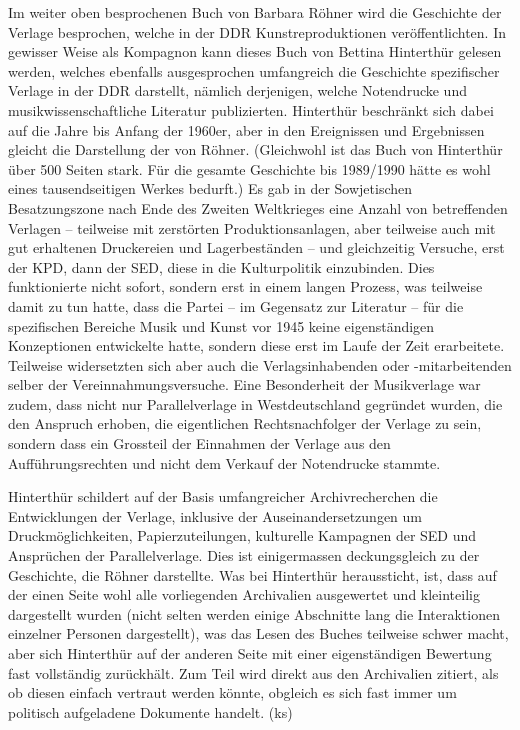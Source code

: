 \documentclass[a4paper,
fontsize=11pt,
oneside,
numbers=noperiodatend,
parskip=half-,
bibliography=totoc,
final
]{scrartcl}
\begin{document}
Im weiter oben besprochenen Buch von Barbara Röhner wird die Geschichte
der Verlage besprochen, welche in der DDR Kunstreproduktionen
veröffentlichten. In gewisser Weise als Kompagnon kann dieses Buch von
Bettina Hinterthür gelesen werden, welches ebenfalls ausgesprochen
umfangreich die Geschichte spezifischer Verlage in der DDR darstellt,
nämlich derjenigen, welche Notendrucke und musikwissenschaftliche
Literatur publizierten. Hinterthür beschränkt sich dabei auf die Jahre
bis Anfang der 1960er, aber in den Ereignissen und Ergebnissen gleicht
die Darstellung der von Röhner. (Gleichwohl ist das Buch von Hinterthür
über 500 Seiten stark. Für die gesamte Geschichte bis 1989/1990 hätte es
wohl eines tausendseitigen Werkes bedurft.) Es gab in der Sowjetischen
Besatzungszone nach Ende des Zweiten Weltkrieges eine Anzahl von
betreffenden Verlagen -- teilweise mit zerstörten Produktionsanlagen,
aber teilweise auch mit gut erhaltenen Druckereien und Lagerbeständen --
und gleichzeitig Versuche, erst der KPD, dann der SED, diese in die
Kulturpolitik einzubinden. Dies funktionierte nicht sofort, sondern erst
in einem langen Prozess, was teilweise damit zu tun hatte, dass die
Partei -- im Gegensatz zur Literatur -- für die spezifischen Bereiche
Musik und Kunst vor 1945 keine eigenständigen Konzeptionen entwickelte
hatte, sondern diese erst im Laufe der Zeit erarbeitete. Teilweise
widersetzten sich aber auch die Verlagsinhabenden oder -mitarbeitenden
selber der Vereinnahmungsversuche. Eine Besonderheit der Musikverlage
war zudem, dass nicht nur Parallelverlage in Westdeutschland gegründet
wurden, die den Anspruch erhoben, die eigentlichen Rechtsnachfolger der
Verlage zu sein, sondern dass ein Grossteil der Einnahmen der Verlage
aus den Aufführungsrechten und nicht dem Verkauf der Notendrucke
stammte.

Hinterthür schildert auf der Basis umfangreicher Archivrecherchen die
Entwicklungen der Verlage, inklusive der Auseinandersetzungen um
Druckmöglichkeiten, Papierzuteilungen, kulturelle Kampagnen der SED und
Ansprüchen der Parallelverlage. Dies ist einigermassen deckungsgleich zu
der Geschichte, die Röhner darstellte. Was bei Hinterthür heraussticht,
ist, dass auf der einen Seite wohl alle vorliegenden Archivalien
ausgewertet und kleinteilig dargestellt wurden (nicht selten werden
einige Abschnitte lang die Interaktionen einzelner Personen
dargestellt), was das Lesen des Buches teilweise schwer macht, aber sich
Hinterthür auf der anderen Seite mit einer eigenständigen Bewertung fast
vollständig zurückhält. Zum Teil wird direkt aus den Archivalien
zitiert, als ob diesen einfach vertraut werden könnte, obgleich es sich
fast immer um politisch aufgeladene Dokumente handelt. (ks)
\end{document}
